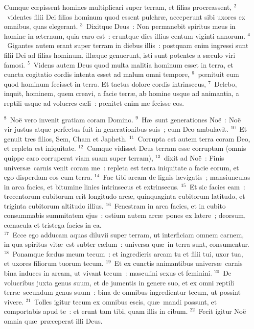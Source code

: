 \lettrine[lines=3,image=true,loversize=0.05,lraise=-0.03]{C}{}umque cœpissent homines multiplicari super terram, et filias procreassent,
${}^{2}$~videntes filii Dei filias hominum quod essent pulchr\ae , acceperunt sibi uxores ex omnibus, quas elegerant.
${}^{3}$~Dixitque Deus~: Non permanebit spiritus meus in homine in \ae ternum, quia caro est~: eruntque dies illius centum viginti annorum.
${}^{4}$~Gigantes autem erant super terram in diebus illis~: postquam enim ingressi sunt filii Dei ad filias hominum, ill\ae que genuerunt, isti sunt potentes a s\ae culo viri famosi.
${}^{5}$~Videns autem Deus quod multa malitia hominum esset in terra, et cuncta cogitatio cordis intenta esset ad malum omni tempore,
${}^{6}$~pœnituit eum quod hominum fecisset in terra. Et tactus dolore cordis intrinsecus,
${}^{7}$~Delebo, inquit, hominem, quem creavi, a facie terr\ae , ab homine usque ad animantia, a reptili usque ad volucres c\ae li~: pœnitet enim me fecisse eos.


${}^{8}$~No\"e vero invenit gratiam coram Domino.
${}^{9}$~H\ae\ sunt generationes No\"e~: No\"e vir justus atque perfectus fuit in generationibus suis~; cum Deo ambulavit.
${}^{10}$~Et genuit tres filios, Sem, Cham et Japheth.
${}^{11}$~Corrupta est autem terra coram Deo, et repleta est iniquitate.
${}^{12}$~Cumque vidisset Deus terram esse corruptam (omnis quippe caro corruperat viam suam super terram),
${}^{13}$~dixit ad No\"e~: Finis univers\ae\ carnis venit coram me~: repleta est terra iniquitate a facie eorum, et ego disperdam eos cum terra.
${}^{14}$~Fac tibi arcam de lignis l\ae vigatis~; mansiunculas in arca facies, et bitumine linies intrinsecus et extrinsecus.
${}^{15}$~Et sic facies eam~: trecentorum cubitorum erit longitudo arc\ae , quinquaginta cubitorum latitudo, et triginta cubitorum altitudo illius.
${}^{16}$~Fenestram in arca facies, et in cubito consummabis summitatem ejus~: ostium autem arc\ae\ pones ex latere~; deorsum, cœnacula et tristega facies in ea.\\
${}^{17}$~Ecce ego adducam aquas diluvii super terram, ut interficiam omnem carnem, in qua spiritus vit\ae\ est subter c\ae lum~: universa qu\ae\ in terra sunt, consumentur.
${}^{18}$~Ponamque fœdus meum tecum~: et ingredieris arcam tu et filii tui, uxor tua, et uxores filiorum tuorum tecum.
${}^{19}$~Et ex cunctis animantibus univers\ae\ carnis bina induces in arcam, ut vivant tecum~: masculini sexus et feminini.
${}^{20}$~De volucribus juxta genus suum, et de jumentis in genere suo, et ex omni reptili terr\ae\ secundum genus suum~: bina de omnibus ingredientur tecum, ut possint vivere.
${}^{21}$~Tolles igitur tecum ex omnibus escis, qu\ae\ mandi possunt, et comportabis apud te~: et erunt tam tibi, quam illis in cibum.
${}^{22}$~Fecit igitur No\"e omnia qu\ae\ pr\ae ceperat illi Deus.

